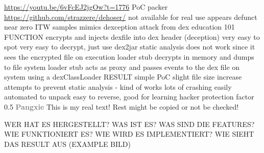\url{https://youtu.be/6vFcEJ2jgOw?t=1776}\newline
PoC packer\newline
\url{https://github.com/strazzere/dehoser/}\newline
not available for real use\newline
appears defunct\newline
near zero ITW samples\newline
mimics dexception attack from dex education 101\newline
FUNCTION\newline
encrypts and injects dexfile into dex header (deception)\newline
very easy to spot\newline
very easy to decrypt, just use dex2jar\newline
static analysis does not work since it sees the encrypted file\newline
on execution loader stub decrypts in memory and dumps to file system\newline
loader stub acts as proxy and passes events to the dex file on system using a dexClassLoader\newline
RESULT\newline
simple PoC\newline
slight file size increase\newline
attempts to prevent static analysis - kind of works\newline
lots of crashing\newline
easily automated to unpack\newline
easy to reverse, good for learning\newline
hacker protection factor 0.5
\newline\newline\textbf{\textcolor{gray}{Pangxie}}\newline
This is my real text! Rest might be copied or not be checked!



WER HAT ES HERGESTELLT? WAS IST ES? WAS SIND DIE FEATURES? WIE FUNKTIONIERT ES? WIE WIRD ES IMPLEMENTIERT? WIE SIEHT DAS RESULT AUS (EXAMPLE BILD)\newline

